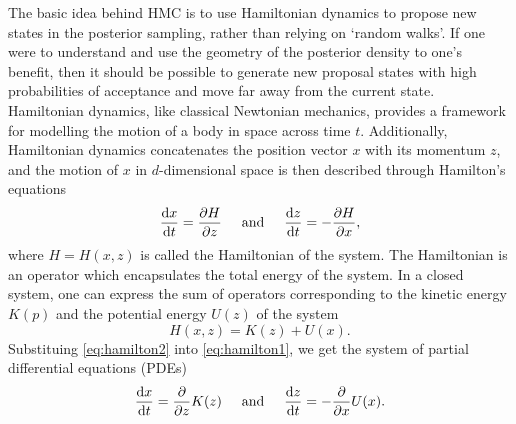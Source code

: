 The basic idea behind HMC is to use Hamiltonian dynamics to propose new states in the posterior sampling, rather than relying on `random walks'.
If one were to understand and use the geometry of the posterior density to one's benefit, then it should be possible to generate new proposal states with high probabilities of acceptance and move far away from the current state.
Hamiltonian dynamics, like classical Newtonian mechanics, provides a framework for modelling the motion of a body in space across time $t$. 
Additionally, Hamiltonian dynamics concatenates the position vector $x$ with its momentum $z$, and the motion of $x$ in $d$-dimensional space is then described through Hamilton's equations
\begin{equation}\label{eq:hamilton1}
  \frac{\text{d} x}{\text{d} t} = \frac{\partial H}{\partial z}
  \hspace{0.5cm}\text{and}\hspace{0.5cm}
  \frac{\text{d} z}{\text{d} t} = -\frac{\partial H}{\partial x},
\end{equation}
where $H=H(x,z)$ is called the Hamiltonian of the system.
The Hamiltonian is an operator which encapsulates the total energy of the system.
In a closed system, one can express the sum of operators corresponding to the kinetic energy $K(p)$ and the potential energy $U(z)$ of the system
\begin{equation}\label{eq:hamilton2}
  H(x,z) = K(z) + U(x).
\end{equation}
Substituing \cref{eq:hamilton2} into \cref{eq:hamilton1}, we get the system of partial differential equations (PDEs)
\begin{equation}\label{eq:hamilton3}
  \frac{\text{d} x}{\text{d} t} = \frac{\partial}{\partial z} K(z)
  \hspace{0.5cm}\text{and}\hspace{0.5cm}
  \frac{\text{d} z}{\text{d} t} = -\frac{\partial}{\partial x}U(x).
\end{equation}

